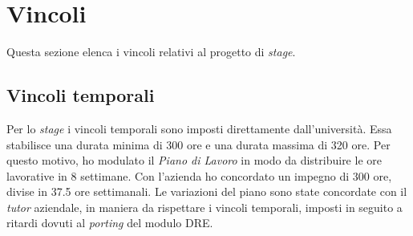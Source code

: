\section{Vincoli}
Questa sezione elenca i vincoli relativi al progetto di \emph{stage}.
\subsection{Vincoli temporali}
Per lo \emph{stage} i vincoli temporali sono imposti direttamente dall'università. Essa stabilisce una durata minima di 300 ore e una durata massima di 320 ore. Per questo motivo, ho modulato il \emph{Piano di Lavoro} in modo da distribuire le ore lavorative in 8 settimane. Con l'azienda ho concordato un impegno di 300 ore, divise in 37.5 ore settimanali. Le variazioni del piano sono state concordate con il \emph{tutor} aziendale, in maniera da rispettare i vincoli temporali, imposti in seguito a ritardi dovuti al \emph{porting} del modulo DRE.
